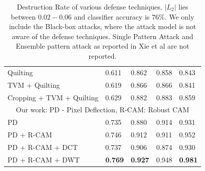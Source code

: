 \begin{table}[H]
\begin{tabular}{lllll}
\small{Quilting}        & 0.611          & 0.862          & 0.858          & 0.843          \\
\small{TVM + Quilting}& 0.619          & 0.866          & 0.866          & 0.841          \\
\small{Cropping + TVM + Quilting} & 0.629          & 0.882          & 0.883          & 0.859          \\ \hline
\multicolumn{5}{c}{Our work: PD - Pixel Deflection, R-CAM: Robust CAM}                                                                    \\ \hline
\small{PD}  & 0.735          & 0.880          & 0.914          & 0.931          \\
\small{PD + R-CAM}       & 0.746          & 0.912          & 0.911          & 0.952          \\
\small{PD + R-CAM + DCT}       & 0.737          & 0.906          & 0.874         & 0.930          \\
\small{PD + R-CAM + DWT}  & \textbf{0.769} & \textbf{0.927} & 0.948          & \textbf{0.981} \\ \hline
\end{tabular}
\caption[Destruction Rate]{Destruction Rate of various defense techniques. $|L_2|$ lies between $0.02 - 0.06$ and classifier accuracy is $76\%$.
We only include the Black-box attacks, where the attack model is not aware of the defense techniques. Single Pattern Attack and Ensemble pattern attack as reported in Xie et al \cite{MitigatingAnon208} are not reported.}
\end{table}

